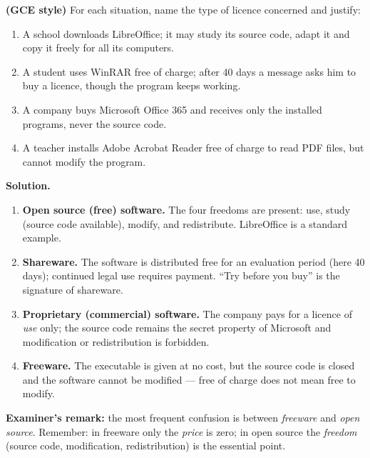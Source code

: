 \documentclass[11pt]{article}
\begin{document}
\begin{exoresolu}
\textbf{(GCE style)} For each situation, name the type of licence concerned and justify:
\begin{enumerate}
\item[a)] A school downloads LibreOffice; it may study its source code, adapt it and copy it freely for all its computers.
\item[b)] A student uses WinRAR free of charge; after 40 days a message asks him to buy a licence, though the program keeps working.
\item[c)] A company buys Microsoft Office 365 and receives only the installed programs, never the source code.
\item[d)] A teacher installs Adobe Acrobat Reader free of charge to read PDF files, but cannot modify the program.
\end{enumerate}
\tcblower
\textbf{Solution.}
\begin{enumerate}
\item[a)] \textbf{Open source (free) software.} The four freedoms are present: use, study (source code available), modify, and redistribute. LibreOffice is a standard example.
\item[b)] \textbf{Shareware.} The software is distributed free for an evaluation period (here 40 days); continued legal use requires payment. ``Try before you buy'' is the signature of shareware.
\item[c)] \textbf{Proprietary (commercial) software.} The company pays for a licence of \emph{use} only; the source code remains the secret property of Microsoft and modification or redistribution is forbidden.
\item[d)] \textbf{Freeware.} The executable is given at no cost, but the source code is closed and the software cannot be modified --- free of charge does not mean free to modify.
\end{enumerate}
\textbf{Examiner's remark:} the most frequent confusion is between \emph{freeware} and \emph{open source}. Remember: in freeware only the \emph{price} is zero; in open source the \emph{freedom} (source code, modification, redistribution) is the essential point.
\end{exoresolu}
\end{document}
